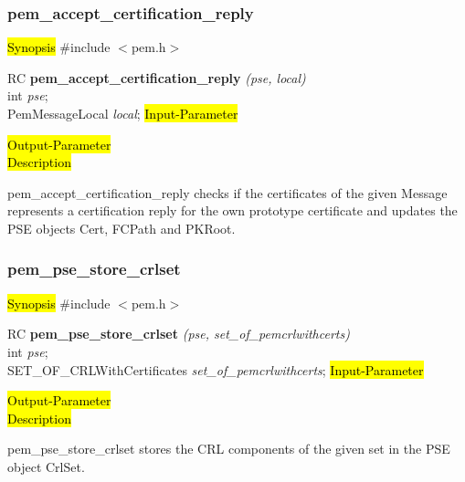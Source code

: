  

\subsubsection{pem\_accept\_certification\_reply}
\label{pem_accept_certification_reply}
\hl{Synopsis}
\#include $<$pem.h$>$ 

RC {\bf pem\_accept\_certification\_reply} {\em (pse, local)} \\
int {\em pse};\\
PemMessageLocal {\em *local};
\hl{Input-Parameter}

\hl{Output-Parameter}
 \\
\hl{Description}

pem\_accept\_certification\_reply checks if the certificates of the given
Message represents a certification reply for the own prototype
certificate and updates the PSE objects
Cert, FCPath and PKRoot.








 

\subsubsection{pem\_pse\_store\_crlset}
\label{pem_pse_store_crlset}
\hl{Synopsis}
\#include $<$pem.h$>$ 

RC {\bf pem\_pse\_store\_crlset} {\em (pse, set\_of\_pemcrlwithcerts)} \\
int {\em pse};\\
SET\_OF\_CRLWithCertificates {\em *set\_of\_pemcrlwithcerts};
\hl{Input-Parameter}

\hl{Output-Parameter}
 \\
\hl{Description}

pem\_pse\_store\_crlset stores the CRL components of the given set in the
PSE object CrlSet.







